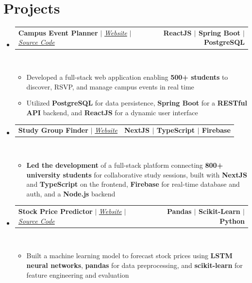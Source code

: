 \documentclass[letterpaper,11pt]{article}
\makeatletter
\newcommand{\resumeItem}[1]{
  \item\small{
    {#1 \vspace{0pt}}
  }
}
\newcommand{\resumeProjectHeading}[2]{
    \item
    \begin{tabular*}{1.001\textwidth}{l@{\extracolsep{\fill}}r}
      \small#1 & \textbf{\small #2}\\
    \end{tabular*}\vspace{-7pt}
}
\newcommand{\resumeSubHeadingListStart}{\begin{itemize}[leftmargin=0.0in, label={}]}
\newcommand{\resumeSubHeadingListEnd}{\end{itemize}}\vspace{0pt}
\newcommand{\resumeItemListStart}{\begin{itemize}}
\newcommand{\resumeItemListEnd}{\end{itemize}\vspace{-5pt}}
\makeatother
\begin{document}
\section{Projects} 
    \vspace{-5pt}
    \resumeSubHeadingListStart
    \resumeProjectHeading
            {\textbf{{Campus Event Planner}} $|$ \emph{\href{https://your-project-link.vercel.app/}{Website}{ $|$ }\href{https://github.com/your-username/your-repo}{Source Code}}}{ReactJS $|$ Spring Boot $|$ PostgreSQL}
            \\[5mm]
          \resumeItemListStart
            \resumeItem{Developed a full-stack web application enabling \textbf{500+ students} to discover, RSVP, and manage campus events in real time}
            \resumeItem{Utilized \textbf{PostgreSQL} for data persistence, \textbf{Spring Boot} for a \textbf{RESTful API} backend, and \textbf{ReactJS} for a dynamic user interface}
          \resumeItemListEnd
 \vspace{-20pt}
 \resumeProjectHeading
            {\textbf{{Study Group Finder}} $|$ \emph{\href{https://your-project-link.vercel.app/}{Website}}}{NextJS $|$ TypeScript $|$ Firebase}
            \\[5mm]
          \resumeItemListStart
            \resumeItem{\textbf{Led the development} of a full-stack platform connecting \textbf{800+ university students} for collaborative study sessions, built with \textbf{NextJS} and \textbf{TypeScript} on the frontend, \textbf{Firebase} for real-time database and auth, and a \textbf{Node.js} backend}
          \resumeItemListEnd
 \vspace{-17pt}
 \resumeProjectHeading
{\textbf{{Stock Price Predictor}} $|$ \emph{\href{https://your-project-link.vercel.app/}{Website}{ $|$ }\href{https://github.com/your-username/your-repo}{Source Code}}}{Pandas $|$ Scikit-Learn $|$ Python}
\\[5mm]
\resumeItemListStart
\resumeItem{Built a machine learning model to forecast stock prices using \textbf{LSTM neural networks}, \textbf{pandas} for data preprocessing, and \textbf{scikit-learn} for feature engineering and evaluation}
\resumeItemListEnd

\resumeSubHeadingListEnd

\vspace{-12pt}
\end{document}
